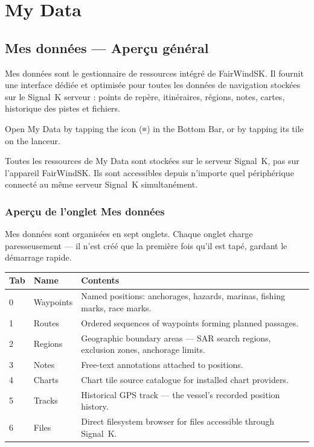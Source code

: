 \part{My Data}

\chapter{Mes données --- Aperçu général}
\label{ch:mydata}

Mes données sont le gestionnaire de ressources intégré de FairWindSK.
Il fournit une interface dédiée et optimisée pour toutes les données de navigation stockées sur le Signal~K
serveur : points de repère, itinéraires, régions, notes, cartes, historique des pistes et fichiers.

Open My Data by tapping the  icon (≡) in the Bottom Bar, or by tapping its tile on the
lanceur.


\begin{notebox}
Toutes les ressources de My Data sont stockées sur le serveur Signal~K, pas sur l'appareil FairWindSK.
Ils sont accessibles depuis n'importe quel périphérique connecté au même serveur Signal~K simultanément.
\end{notebox}

\section{Aperçu de l'onglet Mes données}

Mes données sont organisées en sept onglets.
Chaque onglet charge paresseusement --- il n'est créé que la première fois qu'il est tapé, gardant le démarrage rapide.

\begin{longtable}{C{0.7cm} L{2.8cm} L{10.2cm}}
\toprule
{}
{\sffamily\bfseries\color{white} Tab} &
{\sffamily\bfseries\color{white} Name} &
{\sffamily\bfseries\color{white} Contents} \\
 & Waypoints & Named positions: anchorages, hazards, marinas, fishing marks, race marks. \\
1 & Routes & Ordered sequences of waypoints forming planned passages. \\
2 & Regions & Geographic boundary areas --- SAR search regions, exclusion zones, anchorage limits. \\
3 & Notes & Free-text annotations attached to positions. \\
4 & Charts & Chart tile source catalogue for installed chart providers. \\
5 & Tracks & Historical GPS track --- the vessel's recorded position history. \\
6 & Files & Direct filesystem browser for files accessible through Signal~K. \\
\bottomrule
\end{longtable}

